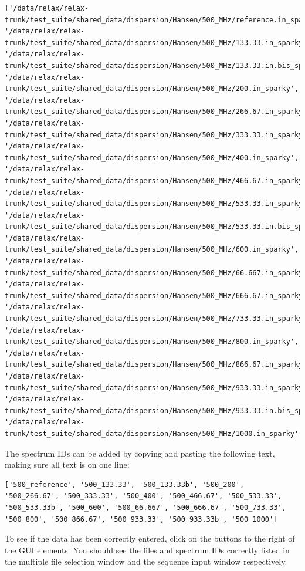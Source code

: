 \begin{lstlisting}[numbers=none]
['/data/relax/relax-trunk/test_suite/shared_data/dispersion/Hansen/500_MHz/reference.in_sparky', '/data/relax/relax-trunk/test_suite/shared_data/dispersion/Hansen/500_MHz/133.33.in_sparky', '/data/relax/relax-trunk/test_suite/shared_data/dispersion/Hansen/500_MHz/133.33.in.bis_sparky', '/data/relax/relax-trunk/test_suite/shared_data/dispersion/Hansen/500_MHz/200.in_sparky', '/data/relax/relax-trunk/test_suite/shared_data/dispersion/Hansen/500_MHz/266.67.in_sparky', '/data/relax/relax-trunk/test_suite/shared_data/dispersion/Hansen/500_MHz/333.33.in_sparky', '/data/relax/relax-trunk/test_suite/shared_data/dispersion/Hansen/500_MHz/400.in_sparky', '/data/relax/relax-trunk/test_suite/shared_data/dispersion/Hansen/500_MHz/466.67.in_sparky', '/data/relax/relax-trunk/test_suite/shared_data/dispersion/Hansen/500_MHz/533.33.in_sparky', '/data/relax/relax-trunk/test_suite/shared_data/dispersion/Hansen/500_MHz/533.33.in.bis_sparky', '/data/relax/relax-trunk/test_suite/shared_data/dispersion/Hansen/500_MHz/600.in_sparky', '/data/relax/relax-trunk/test_suite/shared_data/dispersion/Hansen/500_MHz/66.667.in_sparky', '/data/relax/relax-trunk/test_suite/shared_data/dispersion/Hansen/500_MHz/666.67.in_sparky', '/data/relax/relax-trunk/test_suite/shared_data/dispersion/Hansen/500_MHz/733.33.in_sparky', '/data/relax/relax-trunk/test_suite/shared_data/dispersion/Hansen/500_MHz/800.in_sparky', '/data/relax/relax-trunk/test_suite/shared_data/dispersion/Hansen/500_MHz/866.67.in_sparky', '/data/relax/relax-trunk/test_suite/shared_data/dispersion/Hansen/500_MHz/933.33.in_sparky', '/data/relax/relax-trunk/test_suite/shared_data/dispersion/Hansen/500_MHz/933.33.in.bis_sparky', '/data/relax/relax-trunk/test_suite/shared_data/dispersion/Hansen/500_MHz/1000.in_sparky']
\end{lstlisting}

The spectrum IDs can be added by copying and pasting the following text, making sure all text is on one line:

\begin{lstlisting}[numbers=none]
['500_reference', '500_133.33', '500_133.33b', '500_200', '500_266.67', '500_333.33', '500_400', '500_466.67', '500_533.33', '500_533.33b', '500_600', '500_66.667', '500_666.67', '500_733.33', '500_800', '500_866.67', '500_933.33', '500_933.33b', '500_1000']
\end{lstlisting}

To see if the data has been correctly entered, click on the buttons to the right of the GUI elements.
You should see the files and spectrum IDs correctly listed in the multiple file selection window and the sequence input window respectively.

